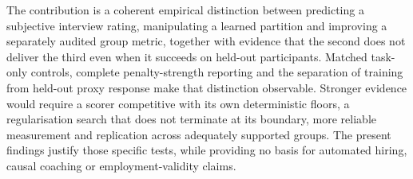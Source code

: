 The contribution is a coherent empirical distinction between predicting a subjective
interview rating, manipulating a learned partition and improving a separately audited
group metric, together with evidence that the second does not deliver the third even when
it succeeds on held-out participants. Matched task-only controls, complete
penalty-strength reporting and the separation of training from held-out proxy response
make that distinction observable. Stronger evidence would require a scorer competitive
with its own deterministic floors, a regularisation search that does not terminate at its
boundary, more reliable measurement and replication across adequately supported groups.
The present findings justify those specific tests, while providing no basis for automated
hiring, causal coaching or employment-validity claims.

